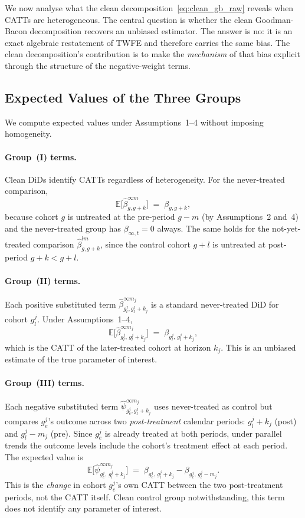 \documentclass[12pt,letterpaper]{article}
\theoremstyle{remark}
\theoremstyle{definition}
\newcommand{\E}{\mathbb{E}}
\newcommand{\hbeta}{\hat{\beta}}
\newcommand{\hpsi}{\hat{\psi}}     %
\begin{document}
We now analyse what the clean decomposition~\eqref{eq:clean_gb_raw} reveals
when CATTs are heterogeneous. The central question is whether the clean
Goodman-Bacon decomposition recovers an unbiased estimator. The answer is no:
it is an exact algebraic restatement of TWFE and therefore carries the same
bias. The clean decomposition's contribution is to make the \emph{mechanism}
of that bias explicit through the structure of the negative-weight terms.

\subsection{Expected Values of the Three Groups}

We compute expected values under Assumptions~1--4 without imposing
homogeneity.

\paragraph{Group~(I) terms.}
Clean DiDs identify CATTs regardless of heterogeneity. For the never-treated
comparison,
\[
  \E\bigl[\hbeta^{\infty m}_{g,g+k}\bigr] \;=\; \beta_{g,g+k},
\]
because cohort $g$ is untreated at the pre-period $g-m$ (by Assumptions~2 and~4)
and the never-treated group has $\beta_{\infty,t}=0$ always. The same holds for
the not-yet-treated comparison $\hbeta^{lm}_{g,g+k}$, since the control cohort
$g+l$ is untreated at post-period $g+k < g+l$.

\paragraph{Group~(II) terms.}
Each positive substituted term $\hbeta^{\infty m_j}_{g_l^j, g_l^j+k_j}$ is a
standard never-treated DiD for cohort $g_l^j$. Under Assumptions~1--4,
\begin{equation}
  \E\bigl[\hbeta^{\infty m_j}_{g_l^j,\,g_l^j+k_j}\bigr]
  \;=\;
  \beta_{g_l^j,\,g_l^j+k_j},
  \label{eq:pos_ev}
\end{equation}
which is the CATT of the later-treated cohort at horizon $k_j$. This is an
unbiased estimate of the true parameter of interest.

\paragraph{Group~(III) terms.}
Each negative substituted term $\hpsi^{\infty m_j}_{g_e^j, g_l^j+k_j}$ uses
never-treated as control but compares $g_e^j$'s outcome across two
\emph{post-treatment} calendar periods: $g_l^j + k_j$ (post) and $g_l^j - m_j$
(pre). Since $g_e^j$ is already treated at both periods, under parallel trends
the outcome levels include the cohort's treatment effect at each period. The
expected value is
\begin{equation}
  \E\bigl[\hpsi^{\infty m_j}_{g_e^j,\,g_l^j+k_j}\bigr]
  \;=\;
  \beta_{g_e^j,\,g_l^j+k_j} - \beta_{g_e^j,\,g_l^j-m_j}.
  \label{eq:neg_ev}
\end{equation}
This is the \emph{change} in cohort $g_e^j$'s own CATT between the two
post-treatment periods, not the CATT itself. Clean control group
notwithstanding, this term does not identify any parameter of interest.
\end{document}
